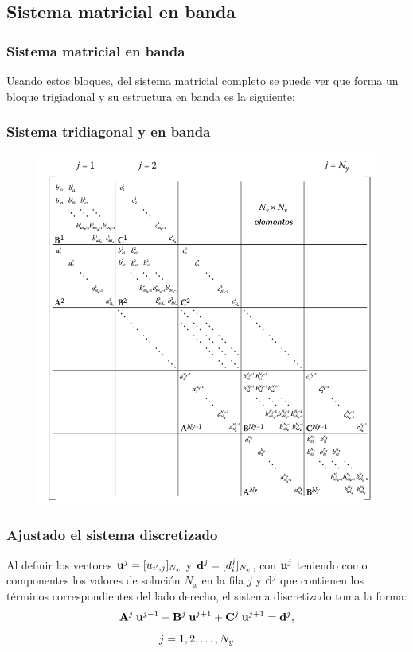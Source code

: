 \subsection{Sistema matricial en banda}
\begin{frame}
\frametitle{Sistema matricial en banda}
Usando estos bloques, del sistema matricial completo se puede ver que forma un bloque trigiadonal y su estructura en banda es la siguiente:
\end{frame}
{
\begin{frame}
\frametitle{Sistema tridiagonal y en banda}
\begin{figure}
	\centering
	\includegraphics[scale=0.27]{Imagenes/Sistema_Matricial_Completo.png}
\end{figure}    
\end{frame}
}
\begin{frame}
\frametitle{Ajustado el sistema discretizado}
Al definir los vectores $\vb{u}^{j} = [u_{i^{\prime}, j}]_{N_{x}}$ y $\vb{d}^{j} = [d_{i}^{j}]_{N_{x}}$, con $\vb{u}^{j}$ teniendo como componentes los valores de solución $N_{x}$ en la fila $j$ y $\mathbf{d}^{j}$ que contienen los términos correspondientes del lado derecho, el sistema discretizado toma la forma:
\pause
\begin{align}
\vb{A}^{j} \: \vb{u}^{j-1} &+ \vb{B}^{j} \: \vb{u}^{j+1} +  \vb{C}^{j} \: \vb{u}^{j+1} = \vb{d}^{j}, \\[0.5em]
&j = 1, 2, \ldots, N_{y}
\label{eq:ecuacion_13_17}
\end{align}
\end{frame}
